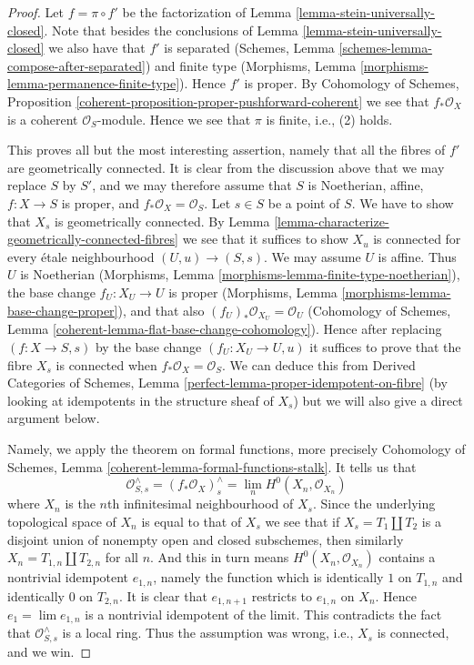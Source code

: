 \begin{proof}
Let $f = \pi \circ f'$ be the factorization of
Lemma \ref{lemma-stein-universally-closed}. Note that besides the
conclusions of Lemma \ref{lemma-stein-universally-closed} we
also have that $f'$ is separated
(Schemes, Lemma \ref{schemes-lemma-compose-after-separated})
and finite type
(Morphisms, Lemma \ref{morphisms-lemma-permanence-finite-type}).
Hence $f'$ is proper. By
Cohomology of Schemes, Proposition
\ref{coherent-proposition-proper-pushforward-coherent}
we see that $f_*\mathcal{O}_X$ is a coherent $\mathcal{O}_S$-module.
Hence we see that $\pi$ is finite, i.e., (2) holds.

\medskip\noindent
This proves all but the most interesting assertion, namely that
all the fibres of $f'$ are geometrically connected.
It is clear from the discussion above that we may replace $S$ by $S'$,
and we may therefore assume that $S$ is Noetherian, affine,
$f : X \to S$ is proper, and $f_*\mathcal{O}_X = \mathcal{O}_S$.
Let $s \in S$ be a point of $S$. We have to show that $X_s$ is
geometrically connected. By Lemma
\ref{lemma-characterize-geometrically-connected-fibres}
we see that it suffices to show $X_u$ is connected
for every \'etale neighbourhood $(U, u) \to (S, s)$.
We may assume $U$ is affine. Thus $U$ is Noetherian
(Morphisms, Lemma \ref{morphisms-lemma-finite-type-noetherian}),
the base change $f_U : X_U \to U$ is proper
(Morphisms, Lemma \ref{morphisms-lemma-base-change-proper}),
and that also $(f_U)_*\mathcal{O}_{X_U} = \mathcal{O}_U$
(Cohomology of Schemes, Lemma \ref{coherent-lemma-flat-base-change-cohomology}).
Hence after replacing
$(f : X \to S, s)$ by the base change $(f_U : X_U \to U, u)$
it suffices to prove that the fibre $X_s$ is connected when
$f_*\mathcal{O}_X = \mathcal{O}_S$. We can deduce this
from Derived Categories of Schemes, Lemma
\ref{perfect-lemma-proper-idempotent-on-fibre}
(by looking at idempotents in the structure sheaf of $X_s$)
but we will also give a direct argument below.

\medskip\noindent
Namely, we apply the theorem on formal functions,
more precisely Cohomology of Schemes, Lemma
\ref{coherent-lemma-formal-functions-stalk}.
It tells us that
$$
\mathcal{O}^\wedge_{S, s} = (f_*\mathcal{O}_X)_s^\wedge =
\lim_n H^0(X_n, \mathcal{O}_{X_n})
$$
where $X_n$ is the $n$th infinitesimal neighbourhood of $X_s$.
Since the underlying topological space of $X_n$ is equal to that
of $X_s$ we see that if $X_s = T_1 \amalg T_2$ is a disjoint union
of nonempty open and closed subschemes, then similarly
$X_n = T_{1, n} \amalg T_{2, n}$ for all $n$. And this in turn means
$H^0(X_n, \mathcal{O}_{X_n})$ contains a nontrivial idempotent $e_{1, n}$,
namely the function which is identically $1$ on $T_{1, n}$ and
identically $0$ on $T_{2, n}$. It is clear that $e_{1, n + 1}$
restricts to $e_{1, n}$ on $X_n$. Hence $e_1 = \lim e_{1, n}$
is a nontrivial idempotent of the limit. This contradicts the fact
that $\mathcal{O}^\wedge_{S, s}$ is a local ring. Thus the
assumption was wrong, i.e., $X_s$ is connected, and we win.
\end{proof}

